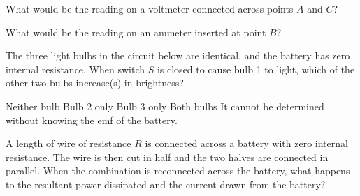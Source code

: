 \documentclass[12pt]{../../../oss-classkick-exam}
\begin{document}
\begin{questions}
  \uplevel{\rule{\linewidth}{.5pt}}

  \question What would be the reading on a voltmeter connected across points
  $A$ and $C$?
  \label{rcirc1}

  \question What would be the reading on an ammeter inserted at point $B$?
  \label{rcirc2}
  


  \question The three light bulbs in the circuit below are identical, and the
  battery has zero internal resistance. When switch $S$ is closed to cause
  bulb 1 to light, which of the other two bulbs increase(s) in brightness?
  \begin{choices}
    \choice Neither bulb
    \choice Bulb 2 only
    \choice Bulb 3 only
    \choice Both bulbs
    \choice It cannot be determined without knowing the emf of the battery.
  \end{choices}
  
  \uplevel{
    \rule{\linewidth}{.5pt}
  }
    
  \question A length of wire of resistance $R$ is connected across a battery
  with zero internal resistance. The wire is then cut in half and the two
  halves are connected in parallel. When the combination is reconnected across
  the battery, what happens to the resultant power dissipated and the current
  drawn from the battery?


\end{questions}
\end{document}
